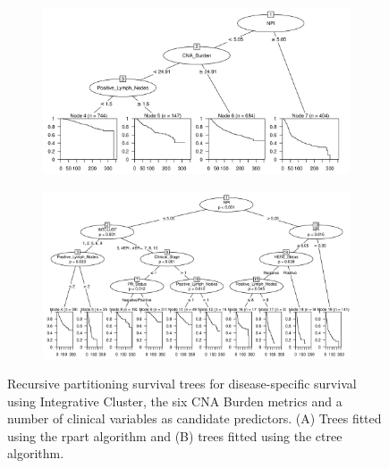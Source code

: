 \begin{figure}[!h]
\centering

\vspace{1cm}

\begin{subfigure}{\textwidth}
\subcaption{}
\includegraphics[width=1\textwidth]{../figures/Chapter_3/Clin_PartyKit_Survival_Burden_DSS_INTCLUST.png}
\end{subfigure}

\vspace{3cm}

\begin{subfigure}{\textwidth}
\subcaption{}
\includegraphics[width=1\textwidth]{../figures/Chapter_3/Clin_Ctree_Survival_Burden_DSS_INTCLUST.png}
\end{subfigure}

\vspace{1cm}

\caption[Recursive partitioning survival trees for disease-specific survival using Integrative Cluster the six CNA Burden metrics and a number of clinical variables as candidate predictors.]{Recursive partitioning survival trees for disease-specific survival using Integrative Cluster, the six CNA Burden metrics and a number of clinical variables as candidate predictors. (A) Trees fitted using the rpart algorithm and (B) trees fitted using the ctree algorithm.}
\label{fig:INTCLUST_CNA_Burden_DSS_Clin}
\end{figure}

